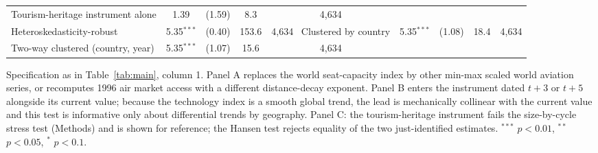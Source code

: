\documentclass[12pt]{article}
\begin{document}
\begin{table}[H]
{\begin{threeparttable}
\begin{tabular}{lcccc}
  Tourism-heritage instrument alone & 1.39 & (1.59) & 8.3 & 4,634 \\
  Heteroskedasticity-robust & 5.35$^{***}$ & (0.40) & 153.6 & 4,634 \
  Clustered by country & 5.35$^{***}$ & (1.08) & 18.4 & 4,634 \\
  Two-way clustered (country, year) & 5.35$^{***}$ & (1.07) & 15.6 & 4,634 \\
\bottomrule
\end{tabular}
\begin{tablenotes}\scriptsize
\item Specification as in Table~\ref{tab:main}, column 1. Panel A replaces the world seat-capacity index by other min-max scaled world aviation series, or recomputes 1996 air market access with a different distance-decay exponent. Panel B enters the instrument dated $t+3$ or $t+5$ alongside its current value; because the technology index is a smooth global trend, the lead is mechanically collinear with the current value and this test is informative only about differential trends by geography. Panel C: the tourism-heritage instrument fails the size-by-cycle stress test (Methods) and is shown for reference; the Hansen test rejects equality of the two just-identified estimates. $^{***}$ $p<0.01$, $^{**}$ $p<0.05$, $^{*}$ $p<0.1$.
\end{tablenotes}
\end{threeparttable}}
\end{table}
\end{document}
